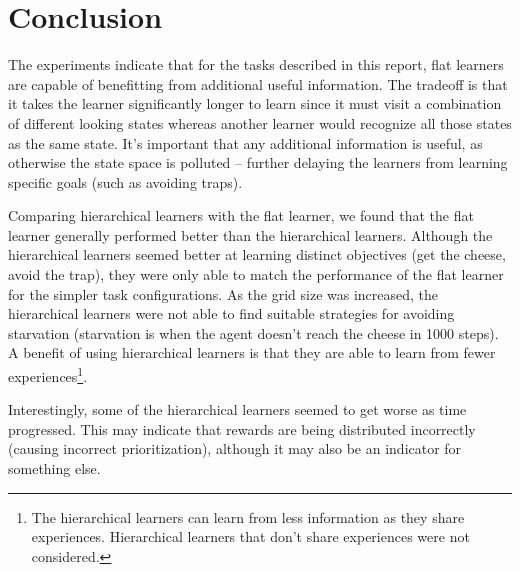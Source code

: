 \documentclass{article}
\begin{document}
	\section{Conclusion}

	The experiments indicate that for the tasks described in this report, flat learners are capable of benefitting from additional useful information. The tradeoff is that it takes the learner significantly longer to learn since it must visit a combination of different looking states whereas another learner would recognize all those states as the same state. It's important that any additional information is useful, as otherwise the state space is polluted -- further delaying the learners from learning specific goals (such as avoiding traps).
	
	Comparing hierarchical learners with the flat learner, we found that the flat learner generally performed better than the hierarchical learners. Although the hierarchical learners seemed better at learning distinct objectives (get the cheese, avoid the trap), they were only able to match the performance of the flat learner for the simpler task configurations. As the grid size was increased, the hierarchical learners were not able to find suitable strategies for avoiding starvation (starvation is when the agent doesn't reach the cheese in 1000 steps).
	A benefit of using hierarchical learners is that they are able to learn from fewer experiences\footnote{The hierarchical learners can learn from less information as they share experiences. Hierarchical learners that don't share experiences were not considered.}.

	Interestingly, some of the hierarchical learners seemed to get worse as time progressed. This may indicate that rewards are being distributed incorrectly (causing incorrect prioritization), although it may also be an indicator for something else.


\newpage


\newpage
\begin{appendices}


\end{appendices}
\end{document}
